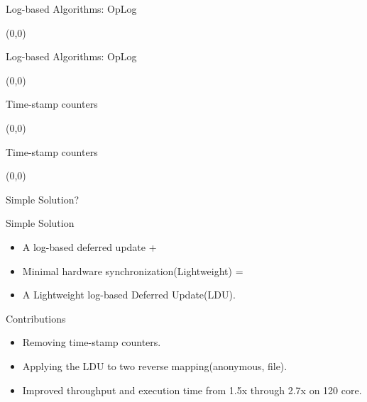 \documentclass[english]{beamer} %
\begin{document}
\begin{frame}{Log-based Algorithms: OpLog}
\begin{textblock}{1}(0,0)
\end{textblock}
\end{frame}

\begin{frame}{Log-based Algorithms: OpLog}
\begin{textblock}{1}(0,0)
\end{textblock}
\end{frame}


\begin{frame}{Time-stamp counters}
\begin{textblock}{1}(0,0)
\end{textblock}
\end{frame}

\begin{frame}{Time-stamp counters}
\begin{textblock}{1}(0,0)
\end{textblock}
\end{frame}


\begin{frame}{Simple Solution?}
\end{frame}

\begin{frame}{Simple Solution}
    \begin{itemize}[<+-| alert@+>]
    \item A log-based deferred update + 
    \item Minimal hardware synchronization(Lightweight) = 
    \item A Lightweight log-based Deferred Update(LDU).
    \end{itemize}
\end{frame}


\begin{frame}{Contributions}
    \begin{itemize}[<+-| alert@+>]
	\item Removing time-stamp counters.
	\item Applying the LDU to two reverse mapping(anonymous, file).
	\item Improved throughput and execution time from 1.5x through 2.7x
	on 120 core.
	\end{itemize}
\end{frame}
\end{document}
